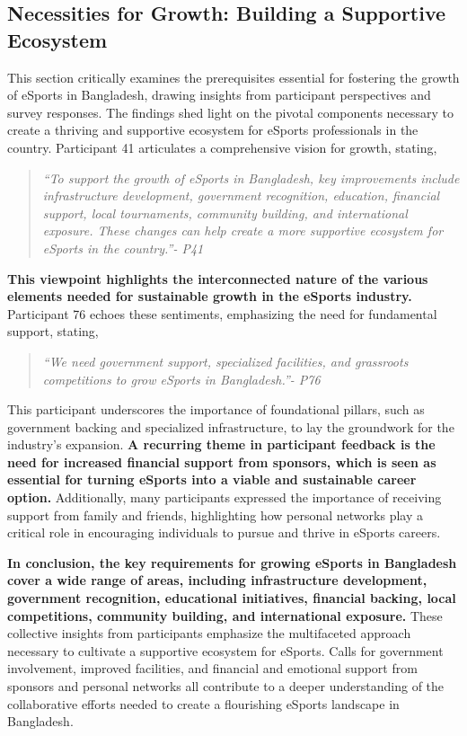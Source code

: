 \documentclass[manuscript,screen,review,anonymous]{acmart}
\begin{document}
\subsection{Necessities for Growth: Building a Supportive Ecosystem}

This section critically examines the prerequisites essential for fostering the growth of eSports in Bangladesh, drawing insights from participant perspectives and survey responses. The findings shed light on the pivotal components necessary to create a thriving and supportive ecosystem for eSports professionals in the country. Participant 41 articulates a comprehensive vision for growth, stating,

\begin{quote}
{\emph{``To support the growth of eSports in Bangladesh, key improvements include infrastructure development, government recognition, education, financial support, local tournaments, community building, and international exposure. These changes can help create a more supportive ecosystem for eSports in the country.''- P41}}
\end{quote}

\textbf{This viewpoint highlights the interconnected nature of the various elements needed for sustainable growth in the eSports industry.} Participant 76 echoes these sentiments, emphasizing the need for fundamental support, stating,

\begin{quote}
{\emph{``We need government support, specialized facilities, and grassroots competitions to grow eSports in Bangladesh.''- P76}}
\end{quote}

This participant underscores the importance of foundational pillars, such as government backing and specialized infrastructure, to lay the groundwork for the industry's expansion. \textbf{A recurring theme in participant feedback is the need for increased financial support from sponsors, which is seen as essential for turning eSports into a viable and sustainable career option.} Additionally, many participants expressed the importance of receiving support from family and friends, highlighting how personal networks play a critical role in encouraging individuals to pursue and thrive in eSports careers.

\textbf{In conclusion, the key requirements for growing eSports in Bangladesh cover a wide range of areas, including infrastructure development, government recognition, educational initiatives, financial backing, local competitions, community building, and international exposure.} These collective insights from participants emphasize the multifaceted approach necessary to cultivate a supportive ecosystem for eSports. Calls for government involvement, improved facilities, and financial and emotional support from sponsors and personal networks all contribute to a deeper understanding of the collaborative efforts needed to create a flourishing eSports landscape in Bangladesh.
\end{document}
